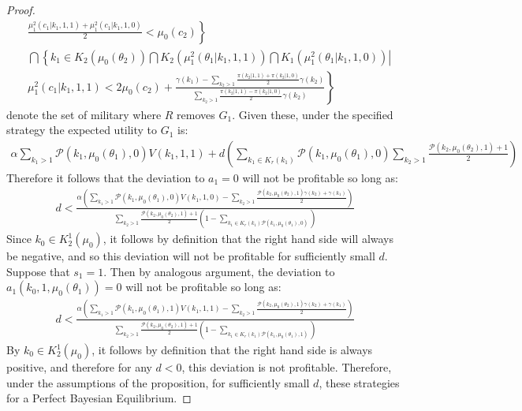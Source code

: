 \documentclass[11pt,]{article}
\begin{document}
\begin{proof}
\begin{align*}
&\left.\frac{\mu_1^2(c_1|k_1,1,1)+\mu_1^2(c_1|k_1,1,0)}{2}<\mu_0(c_2)\right\}\\
&\bigcap\left\{\left.k_1\in K_2(\mu_0(\theta_2))\bigcap K_2(\mu_1^2(\theta_1|k_1,1,1))\bigcap K_1(\mu_1^2(\theta_1|k_1,1,0))\right|\right.\\
&\left.\mu_1^2(c_1|k_1,1,1)<2\mu_0(c_2)+\frac{\gamma(k_1)-\sum_{k_2>1}\frac{\pi(k_2|1,1)+\pi(k_2|1,0)}{2}\gamma(k_2)}{\sum_{k_2>1}\frac{\pi(k_2|1,1)-\pi(k_2|1,0)}{2}\gamma(k_2)}\right\}
\end{align*}denote the set of military where $R$ removes $G_1$.  Given these, under the specified strategy the expected utility to $G_1$ is:
\begin{align*}
\alpha\sum_{k_1>1}\mathcal{P}(k_1,\mu_0(\theta_1),0)V(k_1,1,1)+d\left(\sum_{k_1\in K_r(k_1)}\mathcal{P}(k_1,\mu_0(\theta_1),0)\sum_{k_2>1}\frac{\mathcal{P}(k_2,\mu_0(\theta_2),1)+1}{2}\right)
\end{align*}Therefore it follows that the deviation to $a_1=0$ will not be profitable so long as:
\begin{align*}
d<\frac{\alpha\left(\sum_{k_1>1}\mathcal{P}(k_1,\mu_0(\theta_1),0)V(k_1,1,0)-\sum_{k_2>1}\frac{\mathcal{P}(k_2,\mu_0(\theta_2),1)\gamma(k_2)+\gamma(k_1)}{2}\right)}{\sum_{k_2>1}\frac{\mathcal{P}(k_2,\mu_0(\theta_2),1)+1}{2}\left(1-\sum_{k_1\in K_r(k_1)\mathcal{P}(k_1,\mu_0(\theta_1),0)}\right)}
\end{align*}Since $k_0\in K_2^1(\mu_0)$, it follows by definition that the right hand side will always be negative, and so this deviation will not be profitable for sufficiently small $d$.  Suppose that $s_1=1$.  Then by analogous argument, the deviation to $a_1(k_0,1,\mu_0(\theta_1))=0$ will not be profitable so long as:
\begin{align*}
d<\frac{\alpha\left(\sum_{k_1>1}\mathcal{P}(k_1,\mu_0(\theta_1),1)V(k_1,1,1)-\sum_{k_2>1}\frac{\mathcal{P}(k_2,\mu_0(\theta_2),1)\gamma(k_2)+\gamma(k_1)}{2}\right)}{\sum_{k_2>1}\frac{\mathcal{P}(k_2,\mu_0(\theta_2),1)+1}{2}\left(1-\sum_{k_1\in K_r(k_1)\mathcal{P}(k_1,\mu_0(\theta_1),1)}\right)}
\end{align*}By $k_0\in K_2^1(\mu_0)$, it follows by definition that the right hand side is always positive, and therefore for any $d<0$, this deviation is not profitable.  Therefore, under the assumptions of the proposition, for sufficiently small $d$, these strategies for a Perfect Bayesian Equilibrium.
\end{proof}
\end{document}
